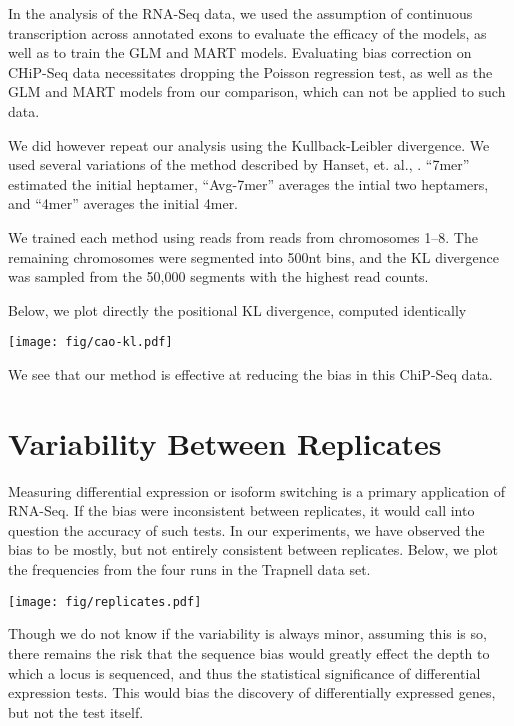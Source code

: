 \documentclass[letterpaper]{article}
\begin{document}
In the analysis of the RNA-Seq data, we used the assumption of continuous
transcription across annotated exons to evaluate the efficacy of the models, as
well as to train the GLM and MART models. Evaluating bias correction on CHiP-Seq
data necessitates dropping the Poisson regression test, as well as the GLM and
MART models from our comparison, which can not be applied to such data.

We did however repeat our analysis using the Kullback-Leibler divergence.
We used several variations of the method described by Hanset, et. al.,
\cite{Hansen2010}. ``7mer'' estimated the initial heptamer, ``Avg-7mer''
averages the intial two heptamers, and ``4mer'' averages the initial 4mer.

We trained each method using reads from reads from chromosomes 1--8. The
remaining chromosomes were segmented into 500nt bins, and the KL divergence was
sampled from the 50,000 segments with the highest read counts.

Below, we plot directly the positional KL divergence, computed identically 

\begin{center}
\texttt{[image: fig/cao-kl.pdf]}
\end{center}

We see that our method is effective at reducing the bias in this ChiP-Seq data.



\section{Variability Between Replicates}

Measuring differential expression or isoform switching is a primary application of
RNA-Seq. If the bias were inconsistent between replicates, it would call into
question the accuracy of such tests. In our experiments, we have observed the
bias to be mostly, but not entirely consistent between replicates. Below, we
plot the frequencies from the four runs in the Trapnell data set.

\begin{center}
\texttt{[image: fig/replicates.pdf]}
\end{center}

Though we do not know if the variability is always minor, assuming this is so,
there remains the risk that the sequence bias would greatly effect the depth to
which a locus is sequenced, and thus the statistical significance of
differential expression tests. This would bias the discovery of differentially
expressed genes, but not the test itself.
\end{document}
